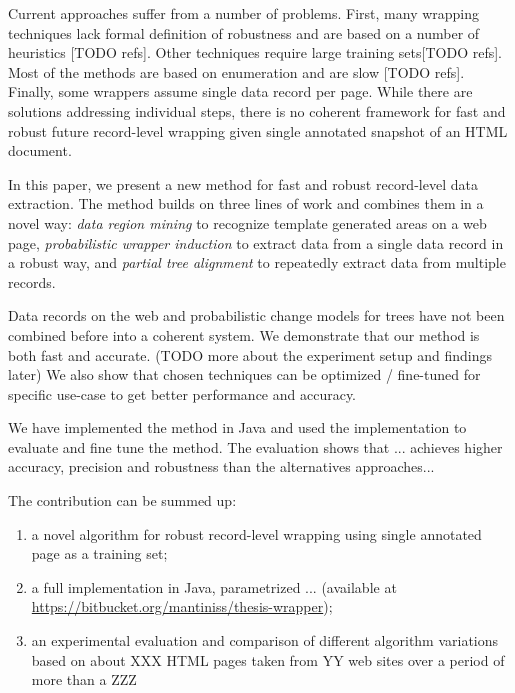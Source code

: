 
Current approaches suffer from a number of problems. First, many wrapping techniques lack formal definition of robustness and are based on a number of heuristics [TODO refs]. Other techniques require large training sets[TODO refs]. Most of the methods are based on enumeration and are slow [TODO refs]. Finally, some wrappers assume single data record per page. While there are solutions addressing individual steps, there is no coherent framework for fast and robust future record-level wrapping given single annotated snapshot of an HTML document.

In this paper, we present a new method for fast and robust record-level data extraction. The method builds on three lines of work and combines them in a novel way: \emph{data region mining} \cite{liu2009a} to recognize template generated areas on a web page, \emph{probabilistic wrapper induction} \cite{DBLP:journals/pvldb/ParameswaranDGR11} to extract data from a single data record in a robust way, and \emph{partial tree alignment} \cite{zhai2005a} to repeatedly extract data from multiple records. 

Data records on the web and probabilistic change models for trees have not been combined before into a coherent system. We demonstrate that our method is both fast and accurate. (TODO more about the experiment setup and findings later) We also show that chosen techniques can be optimized / fine-tuned for specific use-case to get better performance and accuracy.

We have implemented the method in Java and used the implementation to evaluate and fine tune the method. The evaluation shows that ... achieves higher accuracy, precision and robustness than the alternatives approaches...

The contribution can be summed up:

\begin{enumerate}
	\item a novel algorithm for robust record-level wrapping using single annotated page as a training set;
	\item a full implementation in Java, parametrized ... (available at \url{https://bitbucket.org/mantiniss/thesis-wrapper});
	\item an experimental evaluation and comparison of different algorithm variations based on about XXX HTML pages taken from YY web sites over a period of more than a ZZZ 
\end{enumerate}


